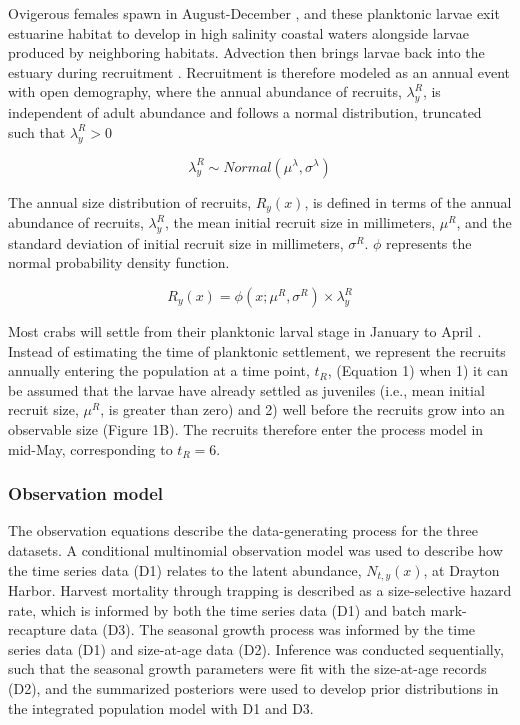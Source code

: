 \documentclass{article}
\begin{document}
Ovigerous females spawn in August-December \parencite{klassen2007biological}, and these planktonic larvae exit estuarine habitat to develop in high salinity coastal waters alongside larvae produced by neighboring habitats. Advection then brings larvae back into the estuary during recruitment \parencite{young2019life}. Recruitment is therefore modeled as an annual event with open demography, where the annual abundance of recruits, $\lambda^R_y$, is independent of adult abundance and follows a normal distribution, truncated such that $\lambda^R_y > 0$  

\begin{equation}
\lambda^R_y \sim Normal(\mu^{\lambda}, \sigma^{\lambda})
\end{equation}

The annual size distribution of recruits, $R_y(x)$, is defined in terms of the annual abundance of recruits, $\lambda^R_y$, the mean initial recruit size in millimeters, $\mu^R$, and the standard deviation of initial recruit size in millimeters, $\sigma^R$. $\phi$ represents the normal probability density function.

\begin{equation}
R_y(x) = \phi(x; \mu^R, \sigma^R) \times \lambda^R_y
\end{equation}

Most crabs will settle from their planktonic larval stage in January to April \parencite{yamada2005growth}. Instead of estimating the time of planktonic settlement, we represent the recruits annually entering the population at a time point, $t_R$, (Equation 1) when 1) it can be assumed that the larvae have already settled as juveniles (i.e., mean initial recruit size, $\mu^R$, is greater than zero) and 2) well before the recruits grow into an observable size (Figure 1B). The recruits therefore enter the process model in mid-May, corresponding to $t_R=6$. 

\subsubsection{Observation model}

The observation equations describe the data-generating process for the three datasets. A conditional multinomial observation model was used to describe how the time series data (D1) relates to the latent abundance, $N_{t,y}(x)$, at Drayton Harbor. Harvest mortality through trapping is described as a size-selective hazard rate, which is informed by both the time series data (D1) and batch mark-recapture data (D3). The seasonal growth process was informed by the time series data (D1) and size-at-age data (D2). Inference was conducted sequentially, such that the seasonal growth parameters were fit with the size-at-age records (D2), and the summarized posteriors were used to develop prior distributions in the integrated population model with D1 and D3.
\end{document}
